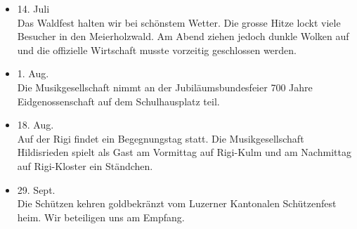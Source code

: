 \begin{history}
\begin{itemize}
        \item[]14. Juli\\
        Das Waldfest halten wir bei schönstem Wetter. Die grosse Hitze lockt
        viele Besucher in den Meierholzwald. Am Abend ziehen jedoch dunkle
        Wolken auf und die offizielle Wirtschaft musste vorzeitig geschlossen
        werden.

        \item[]1. Aug.\\
        Die Musikgesellschaft nimmt an der Jubiläumsbundesfeier 700 Jahre
        Eidgenossenschaft auf dem Schulhausplatz teil.

        \item[]18. Aug.\\
        Auf der Rigi findet ein Begegnungstag statt. Die Musikgesellschaft
        Hildisrieden spielt als Gast am Vormittag auf Rigi-Kulm und am
        Nachmittag auf Rigi-Kloster ein Ständchen.

        \item[]29. Sept.\\
        Die Schützen kehren goldbekränzt vom Luzerner Kantonalen Schützenfest
        heim. Wir beteiligen uns am Empfang.

    \end{itemize}

\end{history}
